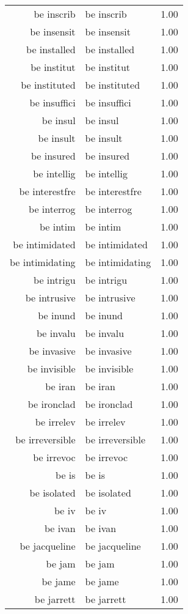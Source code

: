 \begin{table}[ht]
\begin{tabular}{rlr}
  be inscrib & be inscrib & 1.00 \\ 
  be insensit & be insensit & 1.00 \\ 
  be installed & be installed & 1.00 \\ 
  be institut & be institut & 1.00 \\ 
  be instituted & be instituted & 1.00 \\ 
  be insuffici & be insuffici & 1.00 \\ 
  be insul & be insul & 1.00 \\ 
  be insult & be insult & 1.00 \\ 
  be insured & be insured & 1.00 \\ 
  be intellig & be intellig & 1.00 \\ 
  be interestfre & be interestfre & 1.00 \\ 
  be interrog & be interrog & 1.00 \\ 
  be intim & be intim & 1.00 \\ 
  be intimidated & be intimidated & 1.00 \\ 
  be intimidating & be intimidating & 1.00 \\ 
  be intrigu & be intrigu & 1.00 \\ 
  be intrusive & be intrusive & 1.00 \\ 
  be inund & be inund & 1.00 \\ 
  be invalu & be invalu & 1.00 \\ 
  be invasive & be invasive & 1.00 \\ 
  be invisible & be invisible & 1.00 \\ 
  be iran & be iran & 1.00 \\ 
  be ironclad & be ironclad & 1.00 \\ 
  be irrelev & be irrelev & 1.00 \\ 
  be irreversible & be irreversible & 1.00 \\ 
  be irrevoc & be irrevoc & 1.00 \\ 
  be is & be is & 1.00 \\ 
  be isolated & be isolated & 1.00 \\ 
  be iv & be iv & 1.00 \\ 
  be ivan & be ivan & 1.00 \\ 
  be jacqueline & be jacqueline & 1.00 \\ 
  be jam & be jam & 1.00 \\ 
  be jame & be jame & 1.00 \\ 
  be jarrett & be jarrett & 1.00 \\ 

\end{tabular}
\end{table}
